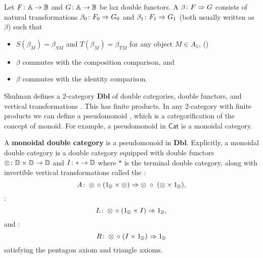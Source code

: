 	
\begin{defn}
Let $F \colon \mathbb{A} \to \mathbb{B}$ and $G \colon \mathbb{A} \to \mathbb{B}$ be lax double functors. A  $\beta \colon F \Rightarrow G$ consists of natural transformations $\beta_0 \colon F_0 \Rightarrow G_0$ and $\beta_1 \colon F_1 \Rightarrow G_1$ (both usually written as $\beta$) such that 
		\begin{itemize}
			\item $S( \beta_M) = \beta_{SM}$ and $T(\beta_M) = \beta_{TM}$ for any object $M \in A_1$, ()
			\item $\beta$ commutes with the composition comparison, and
			\item $\beta$ commutes with the identity comparison.
		\end{itemize}
\end{defn}
	
Shulman defines a 2-category $\mathbf{Dbl}$ of double categories, double functors, and vertical transformations \cite{Shulman2} . This has finite products.  In any 2-category with finite products we can define a pseudomonoid \cite{Monoidalbicatshopfalgebroids}, which is a categorification of the concept of monoid.  For example, a pseudomonoid in $\mathsf{Cat}$ is a monoidal category.
	
\begin{defn}
\label{defn:monoidal_double_category}
    A \textbf{monoidal double category} is a pseudomonoid in $\mathbf{Dbl}$. Explicitly, a monoidal double category is a double category equipped with double functors $\otimes \colon \mathbb{D} \times \mathbb{D} \to \mathbb{D}$ and $I \colon * \to \mathbb{D}$ where $*$ is the terminal double category, along with invertible vertical transformations called the :
    \[  
        A \colon \otimes \, \circ \; (1_{\mathbb{D}} \times \otimes ) \Rightarrow \otimes \; \circ \; (\otimes \times 1_{\mathbb{D}}) ,
    \]
:
\[ L\colon \otimes \, \circ \; (1_{\mathbb{D}} \times I) \Rightarrow 1_{\mathbb{D}} ,\]
and :
\[ R \colon \otimes \,\circ\; (I \times 1_{\mathbb{D}}) \Rightarrow 1_{\mathbb{D}} \]
satisfying the pentagon axiom and triangle axioms.
\end{defn}


